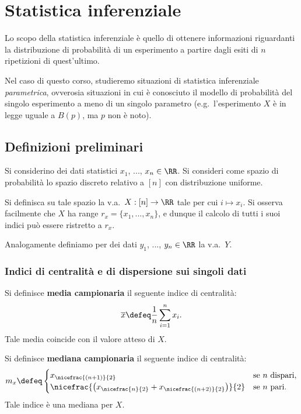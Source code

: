 \chapter{Statistica inferenziale}
\setlength{\parindent}{2pt}

\begin{multicols*}{2}

Lo scopo della statistica inferenziale è quello di ottenere informazioni
riguardanti la distribuzione di probabilità di un esperimento a partire
dagli esiti di $n$ ripetizioni di quest'ultimo. \smallskip

Nel caso di questo corso, studieremo situazioni di statistica inferenziale
\textit{parametrica}, ovverosia situazioni in cui è conosciuto il modello
di probabilità del singolo esperimento a meno di un singolo parametro
(e.g.~l'esperimento $X$ è in legge uguale a $B(p)$, ma $p$ non è noto).

\section{Definizioni preliminari}

Si considerino dei dati statistici $x_1$, ...,
$x_n \in \RR$. Si consideri come spazio di probabilità
lo spazio discreto relativo a $[n]$ con distribuzione
uniforme. \smallskip

Si definisca su tale spazio la v.a.~$X : [n] \to \RR$ tale per cui
$i \mapsto x_i$. Si osserva facilmente che $X$ ha
range $r_x = \{x_1, ..., x_n\}$, e dunque il calcolo di tutti
i suoi indici può essere ristretto a $r_x$. \smallskip

Analogamente definiamo per dei dati $y_1$, ..., $y_n \in \RR$ la v.a.~$Y$.

\subsection{Indici di centralità e di dispersione sui singoli dati}

\begin{definition}
    Si definisce \textbf{media campionaria} il seguente
    indice di centralità:
    \[
        \overline{x} \defeq \frac{1}{n} \sum_{i=1}^n x_i. 
    \]
    Tale media coincide con il valore atteso di $X$.
\end{definition}

\begin{definition}
    Si definisce \textbf{mediana campionaria} il seguente
    indice di centralità:
    \[
        m_x \defeq \begin{cases}
            x_{\nicefrac{(n+1)}{2}} & \mbox{se $n$ dispari}, \\
            \nicefrac{\left(x_{\nicefrac{n}{2}} + x_{\nicefrac{(n+2)}{2}}\right)}{2} & \mbox{se $n$ pari}.
        \end{cases}
    \]
    Tale indice è una mediana per $X$.
\end{definition}


\end{multicols*}
